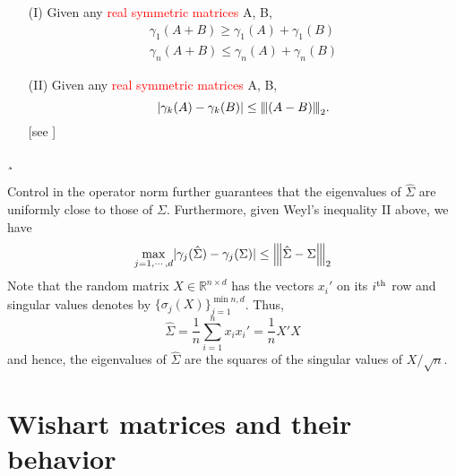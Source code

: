 \documentclass[10pt,handout,english]{beamer}
\newcommand{\ts}{\textsuperscript}
\newcommand{\R}{\mathbb{R}}
\newcommand{\vertiii}[1]{{\left\vert\kern-0.25ex\left\vert\kern-0.25ex\left\vert #1 
    \right\vert\kern-0.25ex\right\vert\kern-0.25ex\right\vert}}
\begin{document}
\begin{frame}[allowframebreaks]
\begin{definition}
\begin{itemize}
\item[(I)]Given any \textcolor{red}{real symmetric matrices} A, B,
\begin{align*}
\gamma_1(A+B)\geq \gamma_1(A)+\gamma_1(B)\\
\gamma_n(A+B)\leq\gamma_n(A)+\gamma_n(B)
\end{align*}
\item[(II)]Given any \textcolor{red}{real symmetric matrices} A, B,
\[
\lvert \gamma_k(A)-\gamma_k(B)\rvert\leq\vertiii{(A-B)}_2.
\]
[see \citet{dasgupta2008asymptotic}]
\end{itemize}¸
\end{definition}
Control in the operator norm further guarantees that the eigenvalues of $\hat{\Sigma}$ are uniformly close to those of $\Sigma$. Furthermore, given Weyl's inequality II above, we have
\[
\max_{j=1,\cdots,d}\lvert \gamma_j(\hat{\Sigma})-\gamma_j(\Sigma)\rvert\leq\vertiii{\hat{\Sigma}-\Sigma}_2
\]
Note that the random matrix $X\in\R^{n\times d}$ has the vectors $x_i'$ on its $i\ts{th}$ row and singular values denotes by $\{\sigma_j(X)\}_{j=1}^{\min{n,d}}$. Thus,
\[
\hat{\Sigma}=\frac{1}{n}\sum\limits_{i=1}^n x_ix_i'=\frac{1}{n}X'X
\]
and hence, the eigenvalues of $\hat{\Sigma}$ are the squares of the singular values of $X/\sqrt{n}$.
\end{frame}
\section{Wishart matrices and their behavior}
\frame{\tableofcontents[currentsection]}
\end{document}
